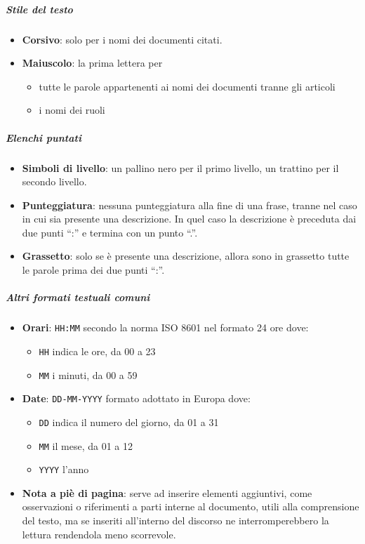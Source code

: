 			\subparagraph{Stile del testo}\label{PS:Documentazione:Design:NormeT:StileTesto}
			\begin{itemize}
				\item \textbf{Corsivo}: solo per i nomi dei documenti citati.
				\item \textbf{Maiuscolo}: la prima lettera per
				\begin{itemize}
					\item tutte le parole appartenenti ai nomi dei documenti tranne gli articoli
					\item i nomi dei ruoli
				\end{itemize}
			\end{itemize}

			\subparagraph{Elenchi puntati}\label{PS:Documentazione:Design:NormeT:ElenchiPuntati}
			\begin{itemize}
				\item \textbf{Simboli di livello}: un pallino nero per il primo livello, un trattino per il secondo livello.
				\item \textbf{Punteggiatura}: nessuna punteggiatura alla fine di una frase, tranne nel caso in cui sia presente una descrizione.
					In quel caso la descrizione è preceduta dai due punti ``:'' e termina con un punto ``.''.
				\item \textbf{Grassetto}: solo se è presente una descrizione, allora sono in grassetto tutte le parole prima dei due punti ``:''.
			\end{itemize}

			\subparagraph{Altri formati testuali comuni} \label{PS:Documentazione:Design:NormeT:AltriFormati}
			\begin{itemize}
				\item \textbf{Orari}: \texttt{HH:MM} secondo la norma ISO 8601 nel formato 24 ore dove:
				\begin{itemize}
					\item \texttt{HH} indica le ore, da 00 a 23
					\item \texttt{MM} i minuti, da 00 a 59
				\end{itemize}
				\item \textbf{Date}: \texttt{DD-MM-YYYY} formato adottato in Europa dove:
				\begin{itemize}
					\item \texttt{DD} indica il numero del giorno, da 01 a 31
					\item \texttt{MM} il mese, da 01 a 12
					\item \texttt{YYYY} l'anno
				\end{itemize}
				\item \textbf{Nota a piè di pagina}: serve ad inserire elementi aggiuntivi, come osservazioni o riferimenti a parti interne al documento, utili alla comprensione del testo, ma se inseriti all'interno del discorso ne interromperebbero la lettura rendendola meno scorrevole.
			\end{itemize}


